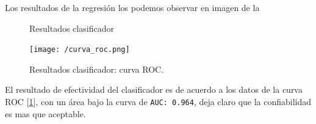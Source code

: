 \documentclass[12pt]{book} %
\begin{document}
		Los resultados de la regresión los podemos observar en imagen de la 
		\begin{figure}[hbt]
			\centering
			\caption{Resultados clasificador}
		\end{figure}
		\begin{figure}[hbt]
			\centering
			\texttt{[image: /curva\_roc.png]} 
			\caption{Resultados clasificador: curva ROC. \label{i_curva_roc}}
		\end{figure}
		El resultado de efectividad del clasificador es de acuerdo a los datos de la curva ROC [\ref{i_curva_roc}], con un área bajo la curva 
		de \texttt{AUC: 0.964}, deja claro que la confiabilidad es mas que aceptable.
		
\end{document}

